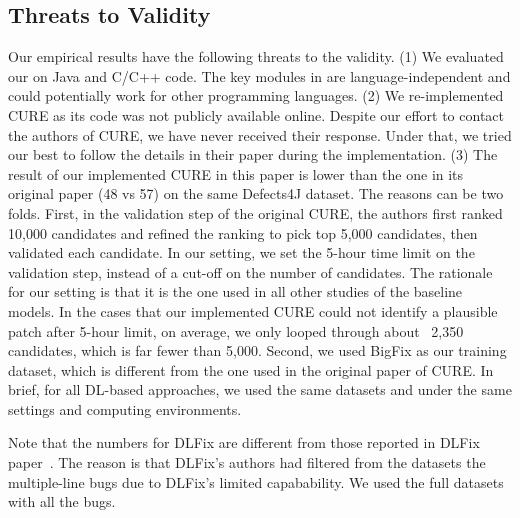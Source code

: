 \subsection{Threats to Validity}



Our empirical results have the following threats to the validity. (1)
We evaluated our {\tool} on Java and C/C++ code.  The key modules in
{\tool} are language-independent and could potentially work for other programming
languages.  (2) We re-implemented CURE as its code was not publicly
available online. Despite our effort to contact the authors of CURE,
we have never received their response. Under that, we tried our best
to follow the details in their paper during the implementation. (3)
The result of our implemented CURE in this paper is lower than the one
in its original paper (48 vs 57) on the same Defects4J dataset. The
reasons can be two folds. First, in the validation step of the
original CURE, the authors first ranked 10,000 candidates and refined
the ranking to pick top 5,000 candidates, then validated each
candidate. In our setting, we set the 5-hour time limit on the
validation step, instead of a cut-off on the number of candidates. The
rationale for our setting is that it is the one used in all other
studies of the baseline models. In the cases that our implemented CURE
could not identify a plausible patch after 5-hour limit, on average,
we only looped through about ~2,350 candidates, which is far fewer
than 5,000. Second, we used BigFix as our training dataset, which is
different from the one used in the original paper of CURE. In brief,
for all DL-based approaches, we used the same datasets and under the
same settings and computing environments.

Note that the numbers for DLFix are different from those reported in
DLFix paper~\cite{icse20}. The reason is that DLFix's authors had
filtered from the datasets the multiple-line bugs due to DLFix's
limited capabability. We used the full datasets with all the bugs.




